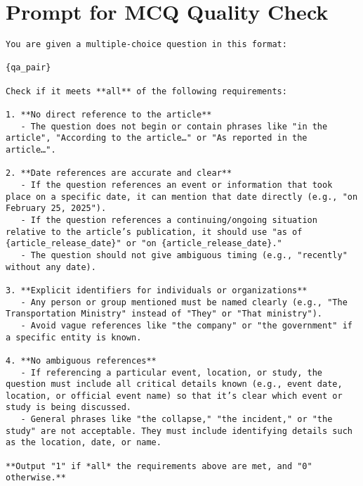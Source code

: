 \documentclass[11pt]{article}
\begin{document}





\clearpage

\section{Prompt for MCQ Quality Check}
\label{app:mcq-quality-check}

\begin{lstlisting}[basicstyle=\ttfamily\small,breaklines=true]
You are given a multiple-choice question in this format:

{qa_pair}

Check if it meets **all** of the following requirements:

1. **No direct reference to the article**  
   - The question does not begin or contain phrases like "in the article", "According to the article…" or "As reported in the article…".  

2. **Date references are accurate and clear**  
   - If the question references an event or information that took place on a specific date, it can mention that date directly (e.g., "on February 25, 2025").  
   - If the question references a continuing/ongoing situation relative to the article’s publication, it should use "as of {article_release_date}" or "on {article_release_date}."  
   - The question should not give ambiguous timing (e.g., "recently" without any date).

3. **Explicit identifiers for individuals or organizations**  
   - Any person or group mentioned must be named clearly (e.g., "The Transportation Ministry" instead of "They" or "That ministry").  
   - Avoid vague references like "the company" or "the government" if a specific entity is known.

4. **No ambiguous references**  
   - If referencing a particular event, location, or study, the question must include all critical details known (e.g., event date, location, or official event name) so that it’s clear which event or study is being discussed.  
   - General phrases like "the collapse," "the incident," or "the study" are not acceptable. They must include identifying details such as the location, date, or name.

**Output "1" if *all* the requirements above are met, and "0" otherwise.**
\end{lstlisting}
\end{document}

